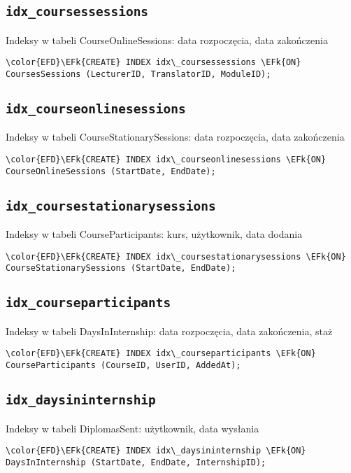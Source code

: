 \documentclass[11pt]{article}
\newcommand{\EFk}[1]{\textcolor{EFk}{\textbf{#1}}} %
\begin{document}
\subsection{\texttt{idx\_coursessessions}}
\label{sec:orgf6d48dc}
Indeksy w tabeli CourseOnlineSessions: data rozpoczęcia, data zakończenia
\begin{Code}
\begin{Verbatim}
\color{EFD}\EFk{CREATE} INDEX idx\_coursessessions \EFk{ON} CoursesSessions (LecturerID, TranslatorID, ModuleID);
\end{Verbatim}
\end{Code}
\subsection{\texttt{idx\_courseonlinesessions}}
\label{sec:org54cd52c}
Indeksy w tabeli CourseStationarySessions: data rozpoczęcia, data zakończenia
\begin{Code}
\begin{Verbatim}
\color{EFD}\EFk{CREATE} INDEX idx\_courseonlinesessions \EFk{ON} CourseOnlineSessions (StartDate, EndDate);
\end{Verbatim}
\end{Code}
\subsection{\texttt{idx\_coursestationarysessions}}
\label{sec:org87ce821}
Indeksy w tabeli CourseParticipants: kurs, użytkownik, data dodania
\begin{Code}
\begin{Verbatim}
\color{EFD}\EFk{CREATE} INDEX idx\_coursestationarysessions \EFk{ON} CourseStationarySessions (StartDate, EndDate);
\end{Verbatim}
\end{Code}
\subsection{\texttt{idx\_courseparticipants}}
\label{sec:orgae3ebe2}
Indeksy w tabeli DaysInInternship: data rozpoczęcia, data zakończenia, staż
\begin{Code}
\begin{Verbatim}
\color{EFD}\EFk{CREATE} INDEX idx\_courseparticipants \EFk{ON} CourseParticipants (CourseID, UserID, AddedAt);
\end{Verbatim}
\end{Code}
\subsection{\texttt{idx\_daysininternship}}
\label{sec:org7535ad3}
Indeksy w tabeli DiplomasSent: użytkownik, data wysłania
\begin{Code}
\begin{Verbatim}
\color{EFD}\EFk{CREATE} INDEX idx\_daysininternship \EFk{ON} DaysInInternship (StartDate, EndDate, InternshipID);
\end{Verbatim}
\end{Code}
\end{document}
